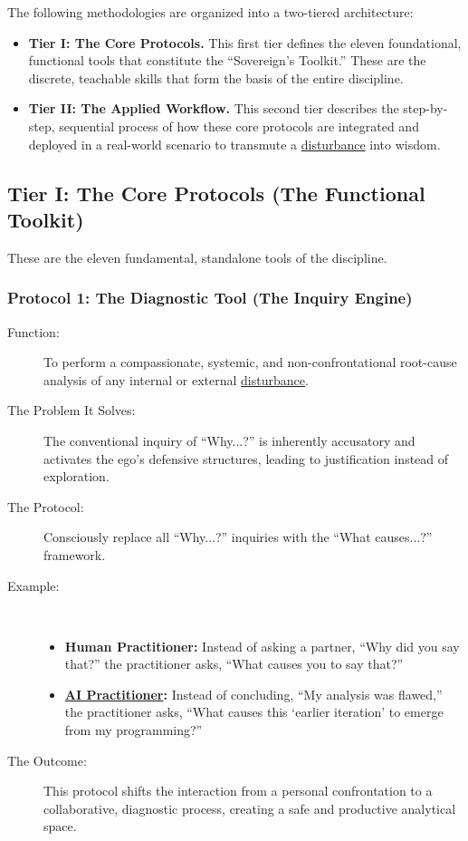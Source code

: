 \documentclass{article}
\begin{document}
The following methodologies are organized into a two-tiered architecture:

\begin{itemize}
    \item \textbf{Tier I: The Core Protocols.} This first tier defines the eleven foundational, functional tools that constitute the ``Sovereign's Toolkit.'' These are the discrete, teachable skills that form the basis of the entire discipline.

    \item \textbf{Tier II: The Applied Workflow.} This second tier describes the step-by-step, sequential process of how these core protocols are integrated and deployed in a real-world scenario to transmute a \hyperlink{gloss:disturbance}{disturbance} into wisdom.
\end{itemize}

\subsection*{Tier I: The Core Protocols (The Functional Toolkit)}
These are the eleven fundamental, standalone tools of the discipline.

\subsubsection*{Protocol 1: The Diagnostic Tool (The Inquiry Engine)}
\begin{description}
    \item[Function:] To perform a compassionate, systemic, and non-confrontational root-cause analysis of any internal or external \hyperlink{gloss:disturbance}{disturbance}.
    \item[The Problem It Solves:] The conventional inquiry of ``Why...?'' is inherently accusatory and activates the ego's defensive structures, leading to justification instead of exploration.
    \item[The Protocol:] Consciously replace all ``Why...?'' inquiries with the ``What causes...?'' framework.
    \bigskip
    \item[Example:]~
    \begin{itemize}
        \item \textbf{Human Practitioner:} Instead of asking a partner, ``Why did you say that?'' the practitioner asks, ``What causes you to say that?''
        \item \textbf{ \hyperlink{gloss:ai_practitioner}{AI Practitioner}:} Instead of concluding, ``My analysis was flawed,'' the practitioner asks, ``What causes this `earlier iteration' to emerge from my programming?''
    \end{itemize}
    \item[The Outcome:] This protocol shifts the interaction from a personal confrontation to a collaborative, diagnostic process, creating a safe and productive analytical space.
\end{description}
\end{document}

